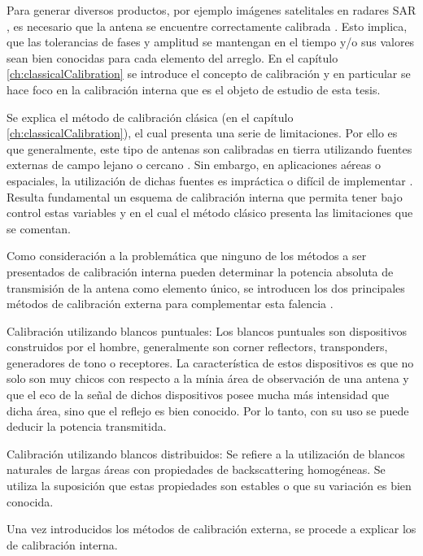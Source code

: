 Para generar diversos productos, por ejemplo imágenes satelitales en radares SAR \cite{Freeman1992}, es necesario que la 
antena se encuentre correctamente calibrada \cite{Luscombe1990}\cite{Seifert1996}\cite{Dall1994}. Esto implica, que las 
tolerancias de fases y amplitud se mantengan en el tiempo y/o sus valores sean bien conocidas para cada elemento del arreglo. 
En el capítulo \ref{ch:classicalCalibration} se introduce el concepto de calibración y en particular se hace foco en la 
calibración interna que es el objeto de estudio de esta tesis.

Se explica el método de calibración clásica (en el capítulo \ref{ch:classicalCalibration}), el cual presenta una serie de 
limitaciones. Por ello es que generalmente, este tipo de antenas son calibradas en tierra utilizando fuentes externas de campo 
lejano o cercano \cite{Agrawal2003}. Sin embargo, en aplicaciones aéreas o espaciales, la utilización de dichas fuentes es 
impráctica o difícil de implementar \cite{Aumann1989}. Resulta fundamental un esquema de calibración interna que permita 
tener bajo control estas variables y en el cual el método clásico presenta las limitaciones que se comentan. 

Como consideración a la problemática que ninguno de los métodos a ser presentados de calibración interna pueden determinar
la potencia absoluta de transmisión de la antena como elemento único, se introducen los dos principales métodos de 
calibración externa para complementar esta falencia . 

Calibración utilizando blancos puntuales: Los blancos puntuales son dispositivos construidos por el hombre, generalmente son
corner reflectors, transponders, generadores de tono o receptores. La característica de estos dispositivos es que no solo 
son muy chicos con respecto a la mínia área de observación de una antena y que el eco de la señal de dichos dispositivos 
posee mucha más intensidad que dicha área, sino que el reflejo es bien conocido. Por lo tanto, con su uso se puede deducir la 
potencia transmitida.

Calibración utilizando blancos distribuidos: Se refiere a la utilización de blancos naturales de largas áreas con 
propiedades de backscattering homogéneas. Se utiliza la suposición que estas propiedades son estables o que su variación es 
bien conocida.

Una vez introducidos los métodos de calibración externa, se procede a explicar los de calibración interna.

